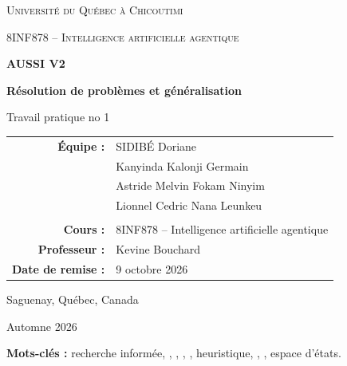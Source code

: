 \documentclass[11pt,a4paper]{article}
\begin{document}
\shorthandoff{:}

\begin{titlepage}
    \centering
    \vspace*{1.2cm}
    {\scshape\Large Université du Québec à Chicoutimi\par}
    \vspace{0.4cm}
    {\scshape\large 8INF878 -- Intelligence artificielle agentique\par}
    \vspace{2cm}
    {\Huge\bfseries AUSSI V2\par}
    \vspace{0.3cm}
    {\LARGE\bfseries Résolution de problèmes et généralisation\par}
    \vspace{1.5cm}
    {\Large Travail pratique no 1\par}
    \vfill
    \begin{tabular}{rl}
        \textbf{Équipe :} & SIDIBÉ Doriane \\
                          & Kanyinda Kalonji Germain \\
                          & Astride Melvin Fokam Ninyim \\
                          & Lionnel Cedric Nana Leunkeu \\
        \\
        \textbf{Cours :} & 8INF878 -- Intelligence artificielle agentique \\
        \textbf{Professeur :} & Kevine Bouchard \\
        \textbf{Date de remise :} & 9 octobre 2026 \\
    \end{tabular}
    \vfill
    {\large Saguenay, Québec, Canada\par}
    {\large Automne 2026\par}
\end{titlepage}

\begin{abstract}
Ce rapport présente \AUSSI{}, un moteur générique de résolution de problèmes
fondé sur la recherche dans un espace d'états. Le système utilise un moteur
commun pour les labyrinthes, la navigation, le N-Puzzle et le jeu arithmétique,
avec les stratégies \BFS{}, \UCS{}, \Greedy{} et \AStar{} et les modes
\TreeSearch{} et \GraphSearch{}. Une évaluation ciblée de 44 exécutions compare
les coûts de solution, les noeuds générés et expansés, la taille de la
frontière et les temps mesurés. Les résultats illustrent notamment l'influence
de la stratégie, de la mémorisation des états et du choix d'heuristique.
\end{abstract}

\noindent\textbf{Mots-clés :}
recherche informée, \AStar{}, \BFS{}, \UCS{}, \Greedy{},
heuristique, \TreeSearch{}, \GraphSearch{}, espace d'états.

\tableofcontents
\clearpage
{}










\end{document}
